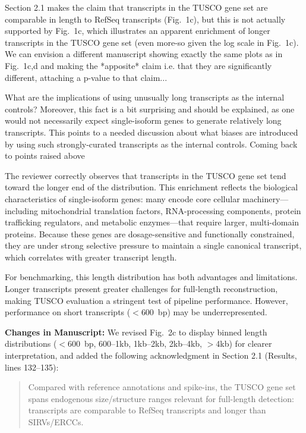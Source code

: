 \documentclass[11pt]{article}
\newcommand{\tuscoGeneSet}{TUSCO gene set}
\begin{document}
\begin{reviewercomment}
Section 2.1 makes the claim that transcripts in the TUSCO gene set are comparable in length to RefSeq transcripts (Fig.~1c), but this is not actually supported by Fig.~1c, which illustrates an apparent enrichment of longer transcripts in the TUSCO gene set (even more-so given the log scale in Fig.~1c). We can envision a different manuscript showing exactly the same plots as in Fig.~1c,d and making the *apposite* claim i.e. that they are significantly different, attaching a p-value to that claim... 

\vspace{0.2cm}
What are the implications of using unusually long transcripts as the internal controls? Moreover, this fact is a bit surprising and should be explained, as one would not necessarily expect single-isoform genes to generate relatively long transcripts. This points to a needed discussion about what biases are introduced by using such strongly-curated transcripts as the internal controls. Coming back to points raised above
\end{reviewercomment}

\begin{responseboxnew}
The reviewer correctly observes that transcripts in the TUSCO gene set tend toward the longer end of the distribution. This enrichment reflects the biological characteristics of single-isoform genes: many encode core cellular machinery---including mitochondrial translation factors, RNA-processing components, protein trafficking regulators, and metabolic enzymes---that require larger, multi-domain proteins. Because these genes are dosage-sensitive and functionally constrained, they are under strong selective pressure to maintain a single canonical transcript, which correlates with greater transcript length.

For benchmarking, this length distribution has both advantages and limitations. Longer transcripts present greater challenges for full-length reconstruction, making TUSCO evaluation a stringent test of pipeline performance. However, performance on short transcripts ($<$600~bp) may be underrepresented.

\vspace{0.3cm}
\textbf{Changes in Manuscript:} We revised Fig.~2c to display binned length distributions ($<$600~bp, 600--1kb, 1kb--2kb, 2kb--4kb, $>$4kb) for clearer interpretation, and added the following acknowledgment in Section 2.1 (Results, lines 132--135):
\begin{quote}
Compared with reference annotations and spike-ins, the \tuscoGeneSet{} spans endogenous size/structure ranges relevant for full-length detection: transcripts are comparable to RefSeq transcripts and longer than SIRVs/ERCCs.
\end{quote}
\end{responseboxnew}
\end{document}

